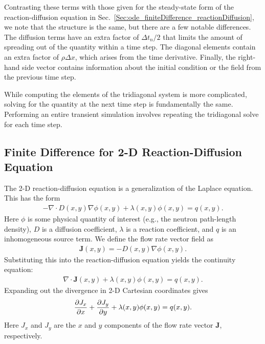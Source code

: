 Contrasting these terms with those given for the steady-state form of the reaction-diffusion equation in Sec.~\ref{Sec:ode_finiteDifference_reactionDiffusion}, we note that the structure is the same, but there are a few notable differences. The diffusion terms have an extra factor of $\Delta t_n / 2$ that limits the amount of spreading out of the quantity within a time step. The diagonal elements contain an extra factor of $\rho \Delta x$, which arises from the time derivative. Finally, the right-hand side vector contains information about the initial condition or the field from the previous time step.

While computing the elements of the tridiagonal system is more complicated, solving for the quantity at the next time step is fundamentally the same. Performing an entire transient simulation involves repeating the tridiagonal solve for each time step.



\subsection{Finite Difference for 2-D Reaction-Diffusion Equation}

The 2-D reaction-diffusion equation is a generalization of the Laplace equation. This has the form
\begin{align}
  -\nabla \cdot D(x,y) \nabla \phi(x,y) + \lambda(x,y) \phi(x,y) = q(x,y) .
\end{align}
Here $\phi$ is some physical quantity of interest (e.g., the neutron path-length density), $D$ is a diffusion coefficient, $\lambda$ is a reaction coefficient, and $q$ is an inhomogeneous source term. We define the flow rate vector field as
\begin{align}
  \mathbf{J}(x,y) = -D(x,y) \nabla \phi(x,y) .
\end{align}
Substituting this into the reaction-diffusion equation yields the continuity equation:
\begin{align}
  \nabla \cdot \mathbf{J}(x,y) + \lambda(x,y) \phi(x,y) = q(x,y) .
\end{align}
Expanding out the divergence in 2-D Cartesian coordinates gives
\begin{align}
  \frac{ \partial {J_x} }{ \partial {x} } + \frac{ \partial {J_y} }{ \partial {y} } + \lambda(x,y) \phi(x,y) = q(x,y) .
\end{align}
Here $J_x$ and $J_y$ are the $x$ and $y$ components of the flow rate vector $\mathbf{J}$, respectively. 

